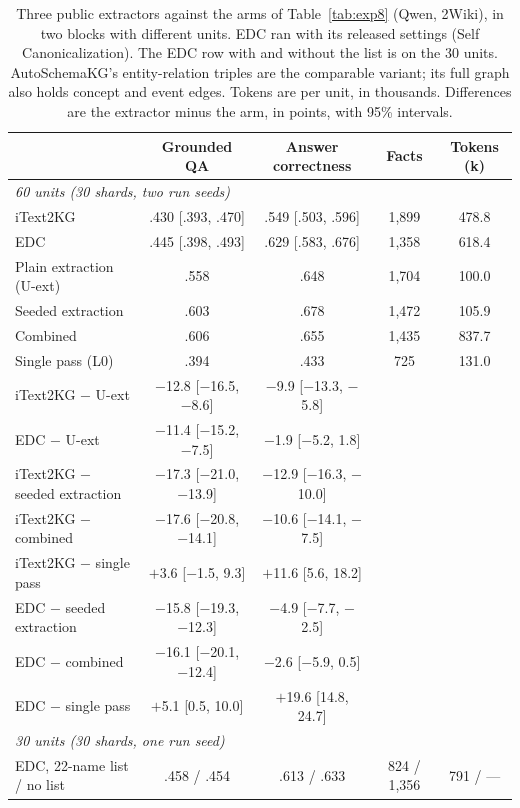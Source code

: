 \begin{table}[t]
\centering
\caption{Three public extractors against the arms of Table~\ref{tab:exp8} (Qwen, 2Wiki), in two blocks with different units. EDC ran with its released settings (Self Canonicalization). The EDC row with and without the list is on the 30 units. AutoSchemaKG's entity-relation triples are the comparable variant; its full graph also holds concept and event edges. Tokens are per unit, in thousands. Differences are the extractor minus the arm, in points, with 95\% intervals.}
\label{tab:itext}
\scriptsize\setlength{\tabcolsep}{3pt}
\begin{tabular}{lcccc}
\toprule
 & Grounded QA & Answer correctness & Facts & Tokens (k) \\
\midrule
\multicolumn{5}{l}{\emph{60 units (30 shards, two run seeds)}} \\
iText2KG & .430 [.393, .470] & .549 [.503, .596] & 1,899 & 478.8 \\
EDC & .445 [.398, .493] & .629 [.583, .676] & 1,358 & 618.4 \\
Plain extraction (U-ext) & .558 & .648 & 1,704 & 100.0 \\
Seeded extraction & .603 & .678 & 1,472 & 105.9 \\
Combined & .606 & .655 & 1,435 & 837.7 \\
Single pass (L0) & .394 & .433 & 725 & 131.0 \\
iText2KG $-$ U-ext & $-$12.8 [$-$16.5, $-$8.6] & $-$9.9 [$-$13.3, $-$5.8] & & \\
EDC $-$ U-ext & $-$11.4 [$-$15.2, $-$7.5] & $-$1.9 [$-$5.2, 1.8] & & \\
iText2KG $-$ seeded extraction & $-$17.3 [$-$21.0, $-$13.9] & $-$12.9 [$-$16.3, $-$10.0] & & \\
iText2KG $-$ combined & $-$17.6 [$-$20.8, $-$14.1] & $-$10.6 [$-$14.1, $-$7.5] & & \\
iText2KG $-$ single pass & $+$3.6 [$-$1.5, 9.3] & $+$11.6 [5.6, 18.2] & & \\
EDC $-$ seeded extraction & $-$15.8 [$-$19.3, $-$12.3] & $-$4.9 [$-$7.7, $-$2.5] & & \\
EDC $-$ combined & $-$16.1 [$-$20.1, $-$12.4] & $-$2.6 [$-$5.9, 0.5] & & \\
EDC $-$ single pass & $+$5.1 [0.5, 10.0] & $+$19.6 [14.8, 24.7] & & \\
\midrule
\multicolumn{5}{l}{\emph{30 units (30 shards, one run seed)}} \\
EDC, 22-name list / no list & .458 / .454 & .613 / .633 & 824 / 1,356 & 791 / --- \\

\end{tabular}
\end{table}
